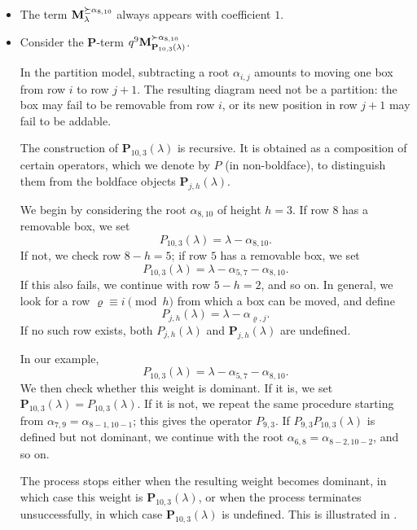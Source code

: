 \begin{itemize}
    \item The term $\mathbf{M}_\lambda^{\succeq \alpha_{8,10}}$ always appears with coefficient $1$.

\item Consider the $\mathbf{P}$-term $q^9\mathbf{M}_{\mathbf{P}_{10,3}(\lambda)}^{\succ \alpha_{8,10}}$.
 
In the partition model, subtracting a root $\alpha_{i,j}$ amounts to moving one box from row $i$ to row $j+1$. The resulting diagram need not be a partition: the box may fail to be removable from row $i$, or its new position in row $j+1$ may fail to be addable. 

The construction of $\mathbf{P}_{10,3}(\lambda)$ is recursive. It is obtained as a composition of certain operators, which we denote by $P$ (in non-boldface), to distinguish them from the boldface objects $\mathbf{P}_{j,h}(\lambda)$.

We begin by considering the  root $\alpha_{8,10}$ of height $h=3$. If row $8$ has a removable box, we set
\begin{equation}
P_{10,3}(\lambda)=\lambda-\alpha_{8,10}.
\end{equation}
If not, we check row $8-h=5$; if row $5$ has a removable box, we set
\begin{equation}
P_{10,3}(\lambda)=\lambda-\alpha_{5,7}-\alpha_{8,10}.
\end{equation}
If this also fails, we continue with row $5-h=2$, and so on. In general, we look for a row $\varrho\equiv i\pmod h$ from which a box can be moved, and define
\begin{equation}
P_{j,h}(\lambda)=\lambda-\alpha_{\varrho,j}.
\end{equation}
If no such row exists, both $P_{j,h}(\lambda)$ and $\mathbf{P}_{j,h}(\lambda)$ are undefined.

In our example,
\begin{equation}
P_{10,3}(\lambda)=\lambda-\alpha_{5,7}-\alpha_{8,10}.
\end{equation}
We then check whether this weight is dominant. If it is, we set $\mathbf{P}_{10,3}(\lambda)=P_{10,3}(\lambda)$. If it is not, we repeat the same procedure starting from $\alpha_{7,9}=\alpha_{8-1,10-1}$; this gives the operator $P_{9,3}$. If $P_{9,3}P_{10,3}(\lambda)$ is defined but not dominant, we continue with the root $\alpha_{6,8}=\alpha_{8-2,10-2}$, and so on.

The process stops either when the resulting weight becomes dominant, in which case this weight is $\mathbf{P}_{10,3}(\lambda)$, or when the process terminates unsuccessfully, in which case $\mathbf{P}_{10,3}(\lambda)$ is undefined. This is illustrated in .


\end{itemize}
